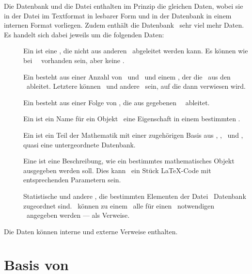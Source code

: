 Die Datenbank und die Datei enthalten im Prinzip die gleichen Daten, wobei sie in der Datei im Textformat in lesbarer Form und in der Datenbank in einem internen Format vorliegen.
Zudem enthält die Datenbank \textiAlg\ sehr viel mehr Daten. Es handelt sich dabei jeweils um die folgenden Daten:
\begin{description}
	\item[\Axiome]          \label{Daten-Axiom}
	Ein  ist eine \Aussage, die nicht aus anderen \Aussagen\ abgeleitet werden kann.
	Es können wie bei \Saetzen\ \Praemissen\ vorhanden sein, aber keine \Beweise.
	\item[\Saetze]          \label{Daten-Satz}
	Ein  besteht aus einer Anzahl von \Praemissen\ und \Konklusionen\ und einem \Beweis, der die \Konklusionen\ aus den \Praemissen\ ableitet.
	Letztere können \Axiome\ und andere \Saetze\ sein, auf die dann verwiesen wird.
	\item[\Beweise]         \label{Daten-Beweis}
	Ein  besteht aus einer Folge von \Beweisschritten, die aus gegebenen \Praemissen\ \Konklusionen\ ableitet.
	\item[\Fachbegriffe]    \label{Daten-Fachbegriff}
	Ein  ist ein Name für ein Objekt \textbzw\ eine Eigenschaft in einem bestimmten \Teilgebiet.
	\item[\Teilgebiete]     \label{Daten-Teilgebiet}
	Ein  ist ein Teil der Mathematik mit einer zugehörigen Basis aus \Axiomen, \Saetzen, \Fachbegriffen\ und \Ausgabeschemata, quasi eine untergeordnete Datenbank.
	\item[\Ausgabeschemata] \label{Daten-Ausgabeschema}
	Eine  ist eine Beschreibung, wie ein bestimmtes mathematisches Objekt ausgegeben werden soll.
	Dies kann \textzB\ ein Stück \LaTeX-Code mit entsprechenden Parametern sein.
	\item[\Auswertungen]     \label{Daten-Auswertung}
	Statistische und andere \Auswertungen, die bestimmten Elementen der Datei \textbzw\ Datenbank zugeordnet sind.
	\textZB\ können zu einem \Satz\ alle für einen \Beweis\ notwendigen \Axiome\ angegeben werden --- als Verweise.
\end{description}
Die Daten können interne und externe Verweise enthalten.

\section[Basis von Beweisen]{Basis von \Beweisen}%
\label                             {sec-BeweisBasis}

